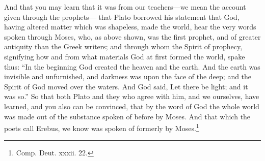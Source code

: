 And that you may learn that it was from our teachers—we mean the account given through the prophets— that Plato borrowed his statement that God, having altered matter which was shapeless, made the world, hear the very words spoken through Moses, who, as above shown, was the first prophet, and of greater antiquity than the Greek writers; and through whom the Spirit of prophecy, signifying how and from what materials God at first formed the world, spake thus: “In the beginning God created the heaven and the earth. And the earth was invisible and unfurnished, and darkness was upon the face of the deep; and the Spirit of God moved over the waters. And God said, Let there be light; and it was so.” So that both Plato and they who agree with him, and we ourselves, have learned, and you also can be convinced, that by the word of God the whole world was made out of the substance spoken of before by Moses. And that which the poets call Erebus, we know was spoken of formerly by Moses.\footnote{Comp. Deut. xxxii. 22.}


